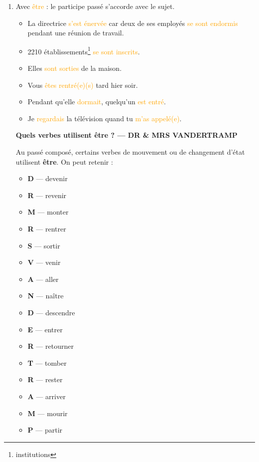 \documentclass[math,code]{amznotes}
\theoremstyle{remark}
\begin{document}
\begin{enumerate}
    \item Avec \textcolor{orange}{\^etre} : le participe passé s'accorde avec le sujet.
    \begin{itemize}
        \item La directrice \textcolor{orange}{s'est énervée} car deux de ses employés \textcolor{orange}{se sont endormis} pendant une réunion de travail.
        \item 2210 établissements\footnote{institutions} \textcolor{orange}{se sont inscrits}.
        \item Elles \textcolor{orange}{sont sorties} de la maison.
        \item Vous \textcolor{orange}{êtes rentré(e)(s)} tard hier soir.
        \item Pendant qu'elle \textcolor{orange}{dormait}, quelqu'un \textcolor{orange}{est entré}.
        \item Je \textcolor{orange}{regardais} la télévision quand tu \textcolor{orange}{m'as appelé(e)}.
    \end{itemize}

    \begin{notebox}
        \textbf{Quels verbes utilisent être ? --- DR \& MRS VANDERTRAMP}
        
        Au passé composé, certains verbes de mouvement ou de changement d'état
        utilisent \textbf{être}. On peut retenir :
        
        \begin{itemize}
            \item \textbf{D} --- devenir
            \item \textbf{R} --- revenir
            \item \textbf{M} --- monter
            \item \textbf{R} --- rentrer
            \item \textbf{S} --- sortir
            \item \textbf{V} --- venir
            \item \textbf{A} --- aller
            \item \textbf{N} --- naître
            \item \textbf{D} --- descendre
            \item \textbf{E} --- entrer
            \item \textbf{R} --- retourner
            \item \textbf{T} --- tomber
            \item \textbf{R} --- rester
            \item \textbf{A} --- arriver
            \item \textbf{M} --- mourir
            \item \textbf{P} --- partir
        \end{itemize}
        

\end{notebox}
\end{enumerate}
\end{document}
